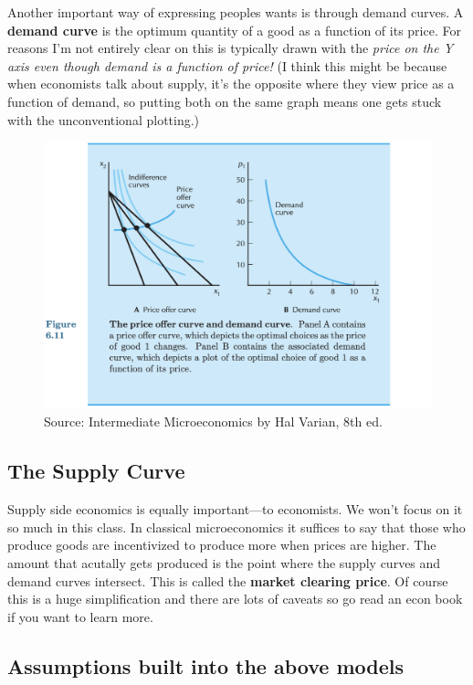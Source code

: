 \documentclass[11pt]{article}
\begin{document}
Another important way of expressing peoples wants is through demand curves. 
A {\bf demand curve} is the optimum quantity of a good as a function of its price. 
For reasons I'm not entirely clear on this is typically drawn with the {\it price on the Y axis even though demand is a function of price!}
(I think this might be because when economists talk about supply, it's the opposite where they view price as a function of demand, so putting both on the same graph means one gets stuck with the unconventional plotting.)



\begin{figure}[h]
    \centering
    \includegraphics*[width=4.5in]{demandcurve.png}
    \caption{Source: Intermediate Microeconomics by Hal Varian, 8th ed.}
    \label{fig:demand}
\end{figure}

\subsection{The Supply Curve}

Supply side economics is equally important---to economists. We won't focus on it so much in this class. In classical microeconomics it suffices to say that those who produce goods are incentivized to produce more when prices are higher. The amount that acutally gets produced is the point where the supply curves and demand curves intersect. This is called the {\bf market clearing price}. Of course this is a huge simplification and there are lots of caveats so go read an econ book if you want to learn more. 


\subsection{Assumptions built into the above models}
\end{document}
